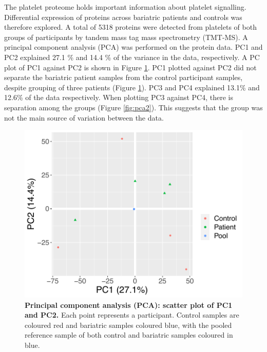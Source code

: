 \documentclass[11pt,twoside]{bristolthesis}
\begin{document}
The platelet proteome holds important information about platelet signalling. Differential expression of proteins across bariatric patients and controls was therefore explored. A total of 5318 proteins were detected from platelets of both groups of participants by tandem mass tag mass spectrometry (TMT-MS). A principal component analysis (PCA) was performed on the protein data. PC1 and PC2 explained 27.1 \% and 14.4 \% of the variance in the data, respectively. A PC plot of PC1 against PC2 is shown in Figure \ref{fig:pca}. PC1 plotted against PC2 did not separate the bariatric patient samples from the control participant samples, despite grouping of three patients (Figure \ref{fig:pca}). PC3 and PC4 explained 13.1\% and 12.6\% of the data respectively. When plotting PC3 against PC4, there is separation among the groups (Figure \ref{fig:pca2}). This suggests that the group was not the main source of variation between the data.



\begin{figure}

{\centering \includegraphics[width=0.8\linewidth]{figure/Bariatric_study/Proteomic_PCA} 

}

\caption[Principal component analysis (PCA): scatter plot of PC1 and PC2]{\textbf{Principal component analysis (PCA): scatter plot of PC1 and PC2.} Each point represents a participant. Control samples are coloured red and bariatric samples coloured blue, with the pooled reference sample of both control and bariatric samples coloured in blue.}\label{fig:pca}
\end{figure}
\end{document}
